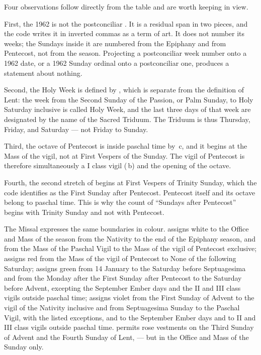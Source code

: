 Four observations follow directly from the table and are worth keeping in view.

First, the 1962  is not the postconciliar .
It is a residual span in two pieces, and the code writes it in inverted commas as a term of art.
It does not number its weeks; the Sundays inside it are numbered from the Epiphany and from
Pentecost, not from the season. Projecting a postconciliar week number onto a 1962 date, or a
1962 Sunday ordinal onto a postconciliar one, produces a statement about nothing.

Second, the Holy Week is defined by , which is separate from the definition of Lent:
the week from the Second Sunday of the Passion, or Palm Sunday, to Holy Saturday inclusive is
called Holy Week, and the last three days of that week are designated by the name of the Sacred
Triduum. The Triduum is thus Thursday, Friday, and Saturday — not Friday to Sunday.

Third, the octave of Pentecost is inside paschal time by \,c, and it begins at the Mass
of the vigil, not at First Vespers of the Sunday. The vigil of Pentecost is therefore
simultaneously a I class vigil (\,b) and the opening of the octave.

Fourth, the second stretch of  begins at First Vespers of Trinity
Sunday, which the code identifies as the First Sunday after Pentecost. Pentecost itself and its
octave belong to paschal time. This is why the count of ``Sundays after Pentecost'' begins with
Trinity Sunday and not with Pentecost.

The Missal expresses the same boundaries in colour.  assigns white to the Office and
Mass of the season from the Nativity to the end of the Epiphany season, and from the Mass of the
Paschal Vigil to the Mass of the vigil of Pentecost exclusive;  assigns red from the
Mass of the vigil of Pentecost to None of the following Saturday;  assigns green from
14 January to the Saturday before Septuagesima and from the Monday after the First Sunday after
Pentecost to the Saturday before Advent, excepting the September Ember days and the II and III
class vigils outside paschal time;  assigns violet from the First Sunday of Advent to
the vigil of the Nativity inclusive and from Septuagesima Sunday to the Paschal Vigil, with the
listed exceptions, and to the September Ember days and to II and III class vigils outside
paschal time.  permits rose vestments on the Third Sunday of Advent and the Fourth
Sunday of Lent,  — but in the Office and
Mass of the Sunday only.

